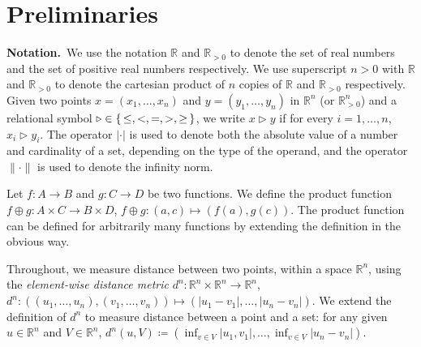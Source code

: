 
\section{Preliminaries}

\smallskip
\noindent\textbf{Notation.}\
We use the notation $\mathbb{R}$ and $\mathbb{R}_{>0}$ to denote the set of real numbers and the set of positive real numbers respectively.
We use superscript $n>0$ with $\mathbb{R}$ and $\mathbb{R}_{>0}$ to denote the cartesian product of $n$ copies of $\mathbb{R}$ and $\mathbb{R}_{>0}$ respectively.
Given two points $x=(x_1,\ldots, x_n)$ and $y=(y_1,\ldots, y_n)$ in $ \mathbb{R}^n$ (or $\mathbb{R}^n_{>0}$) and a relational symbol $\triangleright\in \set{\leq, <, = , >, \geq}$, we write $x\triangleright y$ if for every $i=1,\ldots,n$, $x_i\triangleright y_i$.
The operator $|\cdot |$ is used to denote both the absolute value of a number and cardinality of a set, depending on the type of the operand, and the operator $\| \cdot \|$ is used to denote the infinity norm.  

Let $f\colon A\to B$ and $g\colon C\to D$ be two functions.
We define the product function $f\oplus g\colon A\times C\to B\times D $, $f\oplus g \colon (a,c)\mapsto (f(a),g(c))$.
The product function can be defined for arbitrarily many functions by extending the definition in the obvious way.

Throughout, we measure distance between two points, within a space $\mathbb{R}^n$, using the \emph{element-wise distance metric} $d^n\colon \mathbb{R}^n\times \mathbb{R}^n\to \mathbb{R}^n$, $d^n\colon \left((u_1,\ldots, u_n),(v_1,\ldots,v_n)\right)\mapsto \left(|u_1-v_1|,\ldots,|u_n-v_n|\right)$. 
We extend the definition of $d^n$ to measure distance between a point and a set: for any given $u\in \mathbb{R}^n$ and $V\in \mathbb{R}^n$, $d^n(u,V) \coloneqq \left( \inf_{v\in V}|u_1,v_1|,\ldots, \inf_{v\in V}|u_n-v_n| \right)$.


